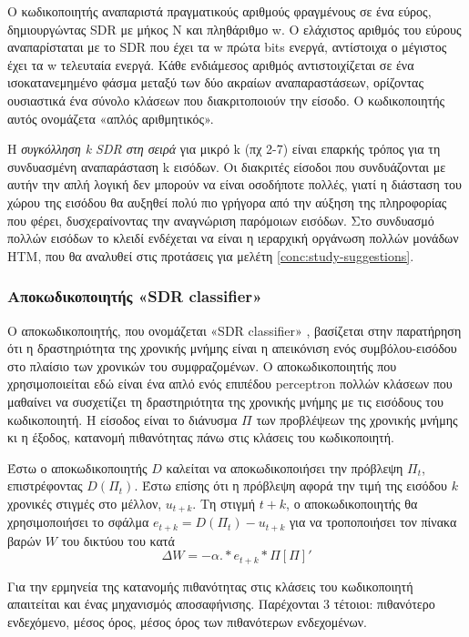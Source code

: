 	Ο κωδικοποιητής αναπαριστά πραγματικούς αριθμούς φραγμένους σε ένα εύρος, δημιουργώντας SDR με μήκος N και πληθάριθμο w.
	Ο ελάχιστος αριθμός του εύρους αναπαρίσταται με το SDR που έχει τα w πρώτα bits ενεργά, αντίστοιχα ο μέγιστος έχει τα w τελευταία ενεργά.
	Κάθε ενδιάμεσος αριθμός αντιστοιχίζεται σε ένα ισοκατανεμημένο φάσμα μεταξύ των δύο ακραίων αναπαραστάσεων,
	ορίζοντας ουσιαστικά ένα σύνολο κλάσεων που διακριτοποιούν την είσοδο.
	Ο κωδικοποιητής αυτός ονομάζετα «απλός αριθμητικός».

	Η \textit{συγκόλληση k SDR στη σειρά} για μικρό k (πχ 2-7) είναι επαρκής τρόπος για τη συνδυασμένη αναπαράσταση k εισόδων.
	Οι διακριτές είσοδοι που συνδυάζονται με αυτήν την απλή λογική δεν μπορούν να είναι οσοδήποτε πολλές,
	γιατί η διάσταση του χώρου της εισόδου θα αυξηθεί πολύ πιο γρήγορα από την αύξηση της πληροφορίας που φέρει,
	δυσχεραίνοντας την αναγνώριση παρόμοιων εισόδων.
	Στο συνδυασμό πολλών εισόδων το κλειδί ενδέχεται να είναι η ιεραρχική οργάνωση πολλών μονάδων HTM,
	που θα αναλυθεί στις προτάσεις για μελέτη \ref{conc:study-suggestions}.

	\subsubsection{Αποκωδικοποιητής «SDR classifier»}

	Ο αποκωδικοποιητής, που ονομάζεται «SDR classifier» \parencite{cuiContinuousOnlineSequence2016},
	βασίζεται στην παρατήρηση ότι η δραστηριότητα της χρονικής μνήμης είναι η απεικόνιση ενός συμβόλου-εισόδου στο πλαίσιο των χρονικών του συμφραζομένων.
	Ο αποκωδικοποιητής που χρησιμοποιείται εδώ είναι ένα απλό ενός επιπέδου perceptron πολλών κλάσεων που μαθαίνει να συσχετίζει
	τη δραστηριότητα της χρονικής μνήμης με τις εισόδους του κωδικοποιητή.
	Η είσοδος είναι το διάνυσμα $Π$ των προβλέψεων της χρονικής μνήμης κι η έξοδος, κατανομή πιθανότητας πάνω στις κλάσεις του κωδικοποιητή.

	Έστω ο αποκωδικοποιητής $D$ καλείται να αποκωδικοποιήσει την πρόβλεψη $Π_t$, επιστρέφοντας
	$D(Π_t)$.
	Έστω επίσης ότι η πρόβλεψη αφορά την τιμή της εισόδου $k$ χρονικές στιγμές στο μέλλον,
	$u_{t+k}$.
	Τη στιγμή $t+k$, ο αποκωδικοποιητής θα χρησιμοποιήσει το σφάλμα $e_{t+k} = D(Π_t) - u_{t+k}$
	για να τροποποιήσει τον πίνακα βαρών $W$ του δικτύου του κατά
	$$ ΔW= -α .* e_{t+k}*Π[Π]' $$

	Για την ερμηνεία της κατανομής πιθανότητας στις κλάσεις του κωδικοποιητή απαιτείται και ένας μηχανισμός αποσαφήνισης.
	Παρέχονται 3 τέτοιοι: πιθανότερο ενδεχόμενο, μέσος όρος, μέσος όρος των πιθανότερων ενδεχομένων.


